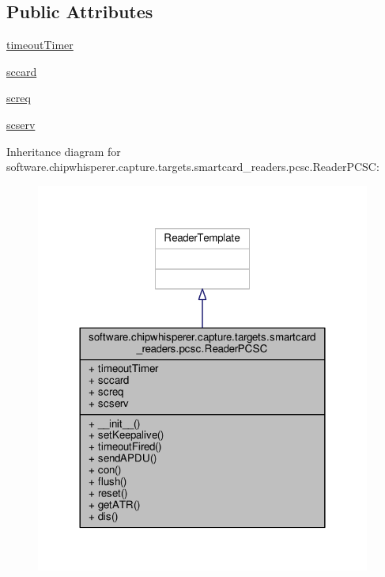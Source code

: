 \subsection*{Public Attributes}
\begin{DoxyCompactItemize}
\item 
\hyperlink{classsoftware_1_1chipwhisperer_1_1capture_1_1targets_1_1smartcard__readers_1_1pcsc_1_1ReaderPCSC_ab9366ef70373d5c8770f93fec7dc3b3d}{timeout\+Timer}
\item 
\hyperlink{classsoftware_1_1chipwhisperer_1_1capture_1_1targets_1_1smartcard__readers_1_1pcsc_1_1ReaderPCSC_a11d9e5741cfb6c9eda68ea6ee4c6f4d0}{sccard}
\item 
\hyperlink{classsoftware_1_1chipwhisperer_1_1capture_1_1targets_1_1smartcard__readers_1_1pcsc_1_1ReaderPCSC_a80c8060727239a9fb32c3dba4a1e2155}{screq}
\item 
\hyperlink{classsoftware_1_1chipwhisperer_1_1capture_1_1targets_1_1smartcard__readers_1_1pcsc_1_1ReaderPCSC_af7386641956b99e9610d3d345987fc77}{scserv}
\end{DoxyCompactItemize}


Inheritance diagram for software.\+chipwhisperer.\+capture.\+targets.\+smartcard\+\_\+readers.\+pcsc.\+Reader\+P\+C\+S\+C\+:\nopagebreak
\begin{figure}[H]
\begin{center}
\leavevmode
\includegraphics[width=312pt]{d2/d21/classsoftware_1_1chipwhisperer_1_1capture_1_1targets_1_1smartcard__readers_1_1pcsc_1_1ReaderPCSC__inherit__graph}
\end{center}
\end{figure}


